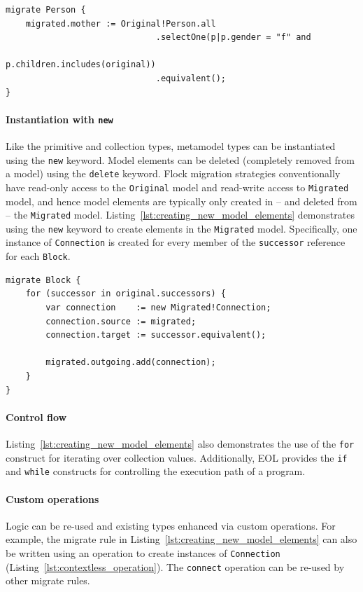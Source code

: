 \begin{lstlisting}[caption=Using metamodel types, label=lst:using_metamodel_types, language=Flock, float=tb]
migrate Person {
	migrated.mother := Original!Person.all
	                          .selectOne(p|p.gender = "f" and
	                                           p.children.includes(original))
	                          .equivalent();
}
\end{lstlisting}

\paragraph{Instantiation with \texttt{new}} Like the primitive and collection types, metamodel types can be instantiated using the \texttt{new} keyword. Model elements can be deleted (completely removed from a model) using the \texttt{delete} keyword. Flock migration strategies conventionally have read-only access to the \texttt{Original} model and read-write access to \texttt{Migrated} model, and hence model elements are typically only created in -- and deleted from -- the \texttt{Migrated} model. Listing~\ref{lst:creating_new_model_elements} demonstrates using the \texttt{new} keyword to create elements in the \texttt{Migrated} model. Specifically, one instance of \texttt{Connection} is created for every member of the \texttt{successor} reference for each \texttt{Block}. 

\begin{lstlisting}[caption=Creating new model elements, label=lst:creating_new_model_elements, language=Flock, float=tb]
migrate Block {
	for (successor in original.successors) {
		var connection    := new Migrated!Connection;
		connection.source := migrated;
		connection.target := successor.equivalent();

		migrated.outgoing.add(connection);
	}
}
\end{lstlisting}

\paragraph{Control flow} Listing~\ref{lst:creating_new_model_elements} also demonstrates the use of the \texttt{for} construct for iterating over collection values. Additionally, EOL provides the \texttt{if} and \texttt{while} constructs for controlling the execution path of a program.


\paragraph{Custom operations} Logic can be re-used and existing types enhanced via custom operations. For example, the migrate rule in Listing~\ref{lst:creating_new_model_elements} can also be written using an operation to create instances of \texttt{Co\-nn\-ec\-ti\-on} (Listing~\ref{lst:contextless_operation}). The \texttt{connect} operation can be re-used by other migrate rules.


